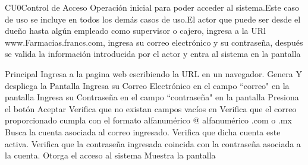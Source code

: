  \begin{UseCase}{CU0}{Control de Acceso}{
		Operación inicial para poder acceder al sistema.Este caso de uso se incluye en todos los demás casos de uso.El actor que puede ser desde el dueño hasta algún empleado como supervisor o cajero, ingresa a la URl www.Farmacias.francs.com, ingresa su correo electrónico y su contraseña, después se valida la información introducida por el actor y entra al sistema en la pantalla  
	}
	\end{UseCase}
	\begin{UCtrayectoria}{Principal}
		\UCpaso[\UCactor] Ingresa a la pagina web escribiendo la URL en un navegador.
		\UCpaso Genera Y despliega la Pantalla 
		\UCpaso [\UCactor] Ingresa su Correo Electrónico en el campo ``correo" en la pantalla 
		\UCpaso [\UCactor] Ingresa su Contraseña en el campo ``contraseña" en la pantalla 
		\UCpaso [\UCactor] Presiona el botón Aceptar
		\UCpaso Verifica que no existan campos vacíos en  
		\UCpaso Verifica que el correo proporcionado cumpla con el formato alfanumérico @ alfanumérico .com o .mx 
		\UCpaso Busca la cuenta asociada al correo ingresado. 
		\UCpaso Verifica que dicha cuenta este activa. 
		\UCpaso Verifica que la contraseña ingresada coincida con la contraseña asociada a la cuenta.
		\UCpaso Otorga el acceso al sistema
		\UCpaso Muestra la pantalla 
	
	\end{UCtrayectoria}

